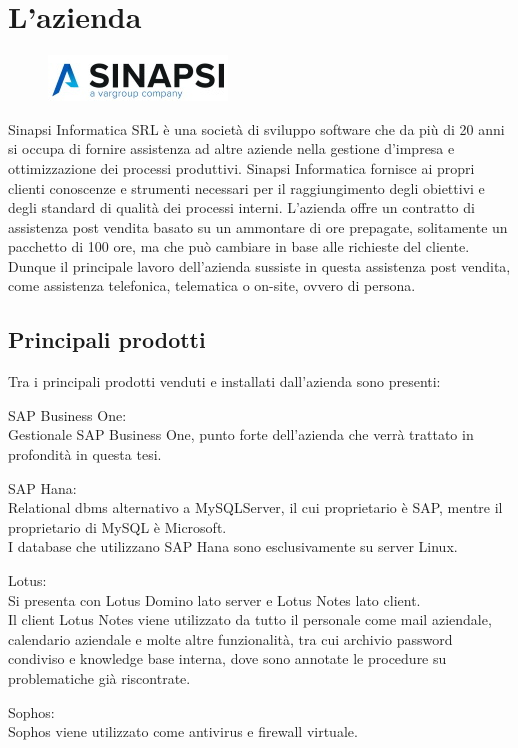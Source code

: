 

\section{L'azienda}
\begin{figure}[!h] 
	\centering 
	\includegraphics{immagini/logo_sinapsi.jpg} 
\end{figure}
Sinapsi Informatica SRL è una società di sviluppo software che da più di 20 anni si occupa di fornire assistenza ad altre aziende nella gestione d'impresa e ottimizzazione dei processi produttivi.
Sinapsi Informatica fornisce ai propri clienti conoscenze e strumenti necessari per il raggiungimento degli obiettivi e degli standard di qualità dei processi interni.
L'azienda offre un contratto di assistenza post vendita basato su un ammontare di ore prepagate, solitamente un pacchetto di 100 ore, ma che può cambiare in base alle richieste del cliente.
Dunque il principale lavoro dell'azienda sussiste in questa assistenza post vendita, come assistenza telefonica, telematica o on-site, ovvero di persona.
\subsection{Principali prodotti}
Tra i principali prodotti venduti e installati dall'azienda sono presenti:
\begin{description}
	\item {SAP Business One:} \\Gestionale SAP Business One, punto forte dell'azienda che verrà trattato in profondità in questa tesi.
	\item {SAP Hana:} \\Relational \gls{dbms} alternativo a MySQLServer, il cui proprietario è SAP, mentre il proprietario di MySQL è Microsoft.\\I database che utilizzano SAP Hana sono esclusivamente su server Linux.
	\item {Lotus:} \\Si presenta con Lotus Domino lato server e Lotus Notes lato client.\\Il client Lotus Notes viene utilizzato da tutto il personale come mail aziendale, calendario aziendale e molte altre funzionalità, tra cui archivio password condiviso e knowledge base interna, dove sono annotate le procedure su problematiche già riscontrate.
	\item {Sophos:} \\Sophos viene utilizzato come antivirus e firewall virtuale.
\end{description}



